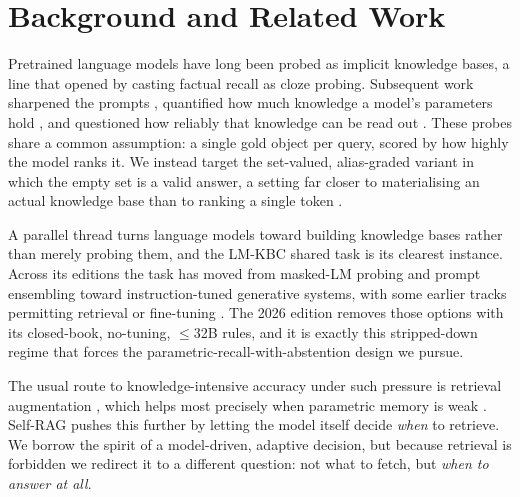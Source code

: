 \section{Background and Related Work}
Pretrained language models have long been probed as implicit knowledge bases, a
line that \citet{petroni2019lama} opened by casting factual recall as cloze
probing. Subsequent work sharpened the prompts \citep{jiang2020lpaqa,
shin2020autoprompt,zhong2021optiprompt}, quantified how much knowledge a model's
parameters hold \citep{roberts2020closedbook}, and questioned how reliably that
knowledge can be read out \citep{cao2021knowledgeable,alkhamissi2022review}.
These probes share a common assumption: a single gold object per query, scored
by how highly the model ranks it. We instead target the set-valued,
alias-graded variant in which the empty set is a valid answer, a setting far
closer to materialising an actual knowledge base than to ranking a single token
\citep{pan2023llmkg}.

A parallel thread turns language models toward building knowledge bases rather
than merely probing them, and the LM-KBC shared task is its clearest instance.
Across its editions \citep{alivanistos2022prompting,kalo2023lmkbc,kalo2024lmkbc,
kalo2025lmkbc} the task has moved from masked-LM probing and prompt ensembling
toward instruction-tuned generative systems, with some earlier tracks permitting
retrieval or fine-tuning \citep{zhang2023llmke}. The 2026 edition removes those
options with its closed-book, no-tuning, $\le$32B rules, and it is exactly this
stripped-down regime that forces the parametric-recall-with-abstention design we
pursue.

The usual route to knowledge-intensive accuracy under such pressure is retrieval
augmentation \citep{lewis2020rag,guu2020realm}, which helps most precisely when
parametric memory is weak \citep{mallen2023whennot}. Self-RAG
\citep{asai2024selfrag} pushes this further by letting the model itself decide
\emph{when} to retrieve. We borrow the spirit of a model-driven, adaptive
decision, but because retrieval is forbidden we redirect it to a different
question: not what to fetch, but \emph{when to answer at all}.


